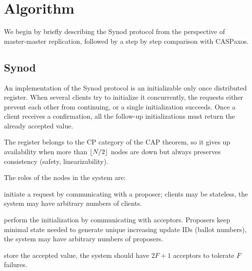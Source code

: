 \documentclass[12pt]{article}
\theoremstyle{definition}
\DeclarePairedDelimiter{\floor}{\lfloor}{\rfloor}
\begin{document}
\section{Algorithm}

We begin by briefly describing the Synod protocol from the perspective of master-master replication, followed by a step by step comparison with CASPaxos.

\subsection{Synod}

An implementation of the Synod protocol is an initializable only once distributed register. When several clients try to initialize it concurrently, the requests either prevent each other from continuing, or a single initialization succeeds. Once a client receives a confirmation, all the follow-up initializations must return the already accepted value.

The register belongs to the CP category of the CAP theorem, so it gives up availability when more than $\floor{N/2}$ nodes are down but always preserves consistency (safety, linearizability).

The roles of the nodes in the system are:

\begin{description}[align=left]
  \item [Clients] initiate a request by communicating with a proposer; clients may be stateless, the system may have arbitrary numbers of clients.
  \item [Proposers] perform the initialization by communicating with acceptors. Proposers keep minimal state needed to generate unique increasing update IDs (ballot numbers), the system may have arbitrary numbers of proposers.
  \item [Acceptors] store the accepted value, the system should have $2F+1$ acceptors to tolerate $F$ failures.
\end{description}
\end{document}
